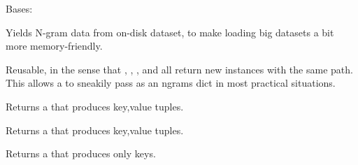 \documentclass[letterpaper,10pt,english]{sphinxmanual}
\begin{document}
\begin{fulllineitems}
\label{tethne.readers.dfr:tethne.readers.dfr.GramGenerator}
Bases: 

Yields N-gram data from on-disk dataset, to make loading big datasets a bit
more memory-friendly.

Reusable, in the sense that , ,
, and  all return new {\hyperref[tethne.readers.dfr:tethne.readers.dfr.GramGenerator]{}}
instances with the same path. This allows a {\hyperref[tethne.readers.dfr:tethne.readers.dfr.GramGenerator]{}} to 
sneakily pass as an ngrams dict in most practical situations.

\begin{fulllineitems}
\label{tethne.readers.dfr:tethne.readers.dfr.GramGenerator.items}
Returns a {\hyperref[tethne.readers.dfr:tethne.readers.dfr.GramGenerator]{}} that produces key,value tuples.

\end{fulllineitems}


\begin{fulllineitems}
\label{tethne.readers.dfr:tethne.readers.dfr.GramGenerator.iteritems}
Returns a {\hyperref[tethne.readers.dfr:tethne.readers.dfr.GramGenerator]{}} that produces key,value tuples.

\end{fulllineitems}


\begin{fulllineitems}
\label{tethne.readers.dfr:tethne.readers.dfr.GramGenerator.keys}
Returns a {\hyperref[tethne.readers.dfr:tethne.readers.dfr.GramGenerator]{}} that produces only keys.

\end{fulllineitems}



\end{fulllineitems}
\end{document}
